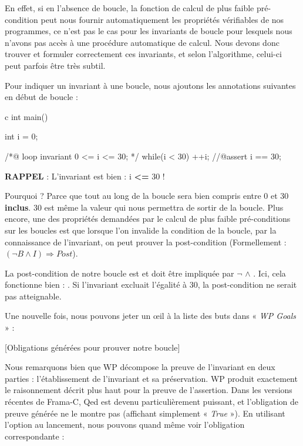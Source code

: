 \documentclass[middle]{zmdocument}
\begin{document}
En effet, si en l'absence de boucle, la fonction de calcul de plus faible 
pré-condition peut nous fournir automatiquement les propriétés vérifiables de nos
programmes, ce n'est pas le cas pour les invariants de boucle pour lesquels 
nous n'avons pas accès à une procédure automatique de calcul. Nous devons donc 
trouver et formuler correctement ces invariants, et selon l'algorithme, celui-ci
peut parfois être très subtil.



Pour indiquer un invariant à une boucle, nous ajoutons les annotations suivantes
en début de boucle :



\begin{CodeBlock}{c}
int main(){
  int i = 0;
  
  /*@
    loop invariant 0 <= i <= 30;
  */
  while(i < 30){
    ++i;
  }
  //@assert i == 30;
}
\end{CodeBlock}



\begin{Warning}
\textbf{RAPPEL} : L'invariant est bien : i \textbf{<=} 30 !
\end{Warning}


Pourquoi ? Parce que tout au long de la boucle  sera bien compris entre
0 et 30 \textbf{inclus}. 30 est même la valeur qui nous permettra de sortir de la 
boucle. Plus encore, une des propriétés demandées par le calcul de plus faible
pré-conditions sur les boucles est que lorsque l'on invalide la condition de la
boucle, par la connaissance de l'invariant, on peut prouver la post-condition 
(Formellement : $(\neg B \wedge I) \Rightarrow Post$).



La post-condition de notre boucle est  et doit être impliquée par
$\neg$  $\wedge$ . Ici, cela fonctionne 
bien : . Si l'invariant excluait 
l'égalité à 30, la post-condition ne serait pas atteignable.



Une nouvelle fois, nous pouvons jeter un œil à la liste des buts dans « \textit{WP 
Goals} » :



[Obligations générées pour prouver notre boucle]


Nous remarquons bien que WP décompose la preuve de l'invariant en deux parties : 
l'établissement de l'invariant et sa préservation. WP produit exactement le 
raisonnement décrit plus haut pour la preuve de l'assertion. Dans les versions
récentes de Frama-C, Qed est devenu particulièrement puissant, et l'obligation de
preuve générée ne le montre pas (affichant simplement « \textit{True} »). En utilisant 
l'option  au lancement, nous pouvons quand même voir 
l'obligation correspondante :
\end{document}
